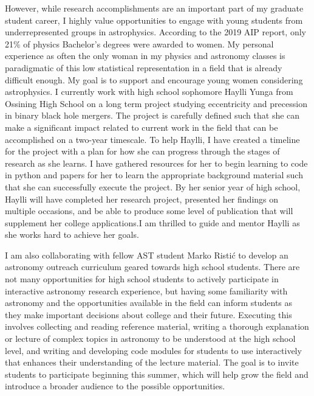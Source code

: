 \documentclass{article}
\begin{document}
However, while research accomplishments are an important part of my graduate student career, I highly value opportunities to engage with young students from underrepresented groups in astrophysics. According to the 2019 AIP report, only 21\% of physics Bachelor’s degrees were awarded to women. My personal experience as often the only woman in my physics and astronomy classes is paradigmatic of this low statistical representation in a field that is already difficult enough. My goal is to support and encourage young women considering astrophysics. I currently work with high school sophomore Haylli Yunga from Ossining High School on a long term project studying eccentricity and precession in binary black hole mergers. The project is carefully defined such that she can make a significant impact related to current work in the field that can be accomplished on a two-year timescale. To help Haylli, I have created a timeline for the project with a plan for how she can progress through the stages of research as she learns. I have gathered resources for her to begin learning to code in python and papers for her to learn the appropriate background material such that she can successfully execute the project. By her senior year of high school, Haylli will have completed her research project, presented her findings on multiple occasions, and be able to produce some level of publication that will supplement her college applications.I am thrilled to guide and mentor Haylli as she works hard to achieve her goals.

I am also collaborating with fellow AST student Marko Ristić to develop an astronomy outreach curriculum geared towards high school students. There are not many opportunities for high school students to actively participate in interactive astronomy research experience, but having some familiarity with astronomy and the opportunities available in the field can inform students as they make important decisions about college and their future. Executing this involves collecting and reading reference material, writing a thorough explanation or lecture of complex topics in astronomy to be understood at the high school level, and writing and developing code modules for students to use interactively that enhances their understanding of the lecture material. The goal is to invite students to participate beginning this summer, which will help grow the field and introduce a broader audience to the possible opportunities. 
\end{document}
